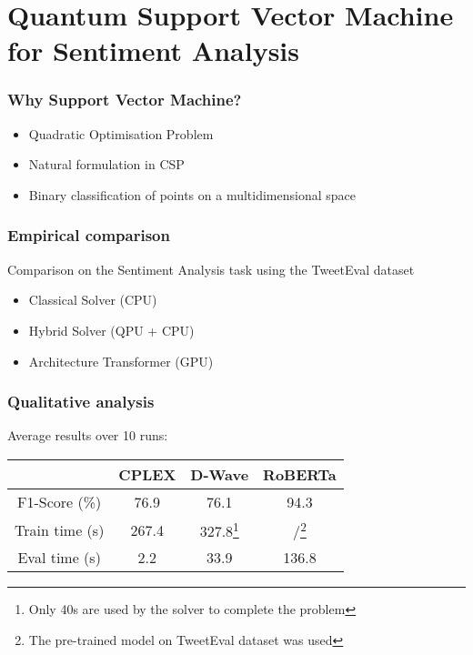 \documentclass[aspectratio=169]{beamer}
\begin{document}
\section{Quantum Support Vector Machine for Sentiment Analysis}

\begin{frame}\frametitle{Why Support Vector Machine?}

    \begin{itemize}
        \item Quadratic Optimisation Problem
        \item Natural formulation in CSP
        \item Binary classification of points on a multidimensional space
    \end{itemize}

\end{frame}

\begin{frame}\frametitle{Empirical comparison}

    Comparison on the Sentiment Analysis task using the TweetEval dataset

    \begin{itemize}
        \item Classical Solver (CPU)
        \item Hybrid Solver (QPU + CPU)
        \item Architecture Transformer (GPU)
    \end{itemize}

\end{frame}

\begin{frame}\frametitle{Qualitative analysis}

    Average results over 10 runs:

    \begin{table}
        \centering
        \begin{tabular}{c|c|c|c}
            & CPLEX & D-Wave & RoBERTa \\ \hline
            F1-Score (\%) & 76.9 & 76.1 & 94.3 \\ \hline
            Train time (s) & 267.4 & 327.8\footnote{Only 40s are used by the solver to complete the problem} & /\footnote{The pre-trained model on TweetEval dataset was used} \\ \hline
            Eval time (s) & 2.2 & 33.9 & 136.8
        \end{tabular}
    \end{table}

\end{frame}
\end{document}
